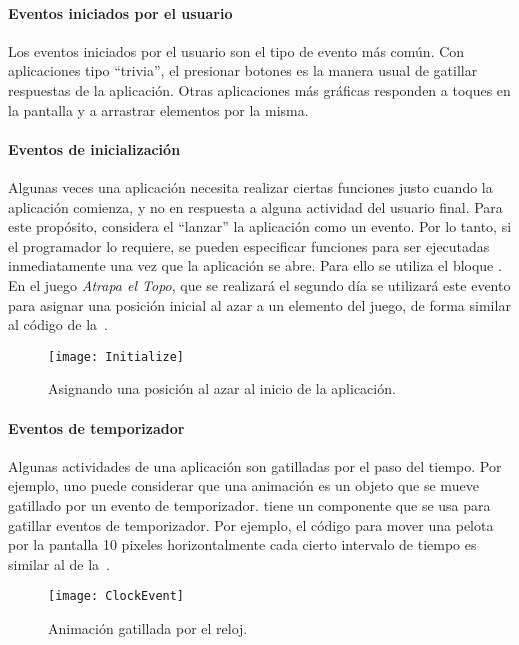 \paragraph{Eventos iniciados por el usuario}
Los eventos iniciados por el usuario son el tipo de evento más
común. Con aplicaciones tipo ``trivia'', el presionar botones es la
manera usual de gatillar respuestas de la aplicación. Otras
aplicaciones más gráficas responden a toques en la pantalla y a
arrastrar elementos por la misma.

\paragraph{Eventos de inicialización}
Algunas veces una aplicación necesita realizar ciertas funciones justo
cuando la aplicación comienza, y no en respuesta a alguna actividad
del usuario final. Para este propósito, \AppInventor considera el
“lanzar” la aplicación como un evento. Por lo tanto, si el programador
lo requiere, se pueden especificar funciones para ser ejecutadas
inmediatamente una vez que la aplicación se abre. Para ello se utiliza
el bloque . En el juego \emph{Atrapa el
  Topo}, que se realizará el segundo día se utilizará este evento para
asignar una posición inicial al azar a un elemento del juego, de forma
similar al código de la~.

\begin{figure}[H]
\centering
\texttt{[image: Initialize]}
\caption{Asignando una posición al azar al inicio de la aplicación.}
\label{fig:initialize}
\end{figure}

\paragraph{Eventos de temporizador}
Algunas actividades de una aplicación son gatilladas por el paso del
tiempo. Por ejemplo, uno puede considerar que una animación es un
objeto que se mueve gatillado por un evento de
temporizador. \AppInventor tiene un componente  que
se usa para gatillar eventos de temporizador. Por ejemplo, el código
para mover una pelota por la pantalla 10 pixeles horizontalmente cada
cierto intervalo de tiempo es similar al de la~.

\begin{figure}[H]
\centering
\texttt{[image: ClockEvent]}
\caption{Animación gatillada por el reloj.}
\label{fig:clockEvent}
\end{figure}

